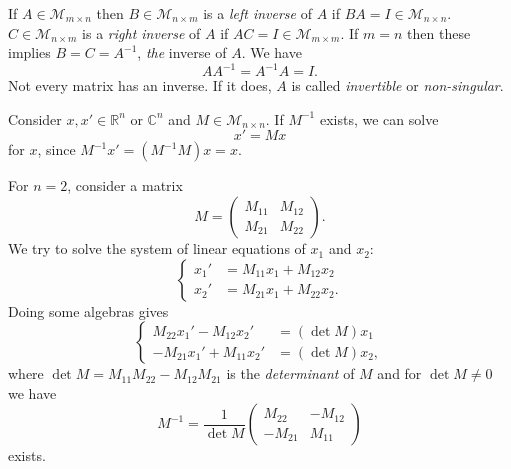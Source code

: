\documentclass[a4paper]{article}
\begin{document}
\begin{definition}
  If $ A\in \mathcal{M}_{m\times n} $ then $ B\in
  \mathcal{M}_{n\times m} $ is a \textit{left inverse} of $A$ if $
  BA=I\in \mathcal{M}_{n \times n} $. $ C\in \mathcal{M}_{n \times m}
  $ is a \textit{right inverse} of $A$ if $ AC=I\in \mathcal{M}_{m
  \times m} $. If $m=n$ then these implies $ B=C=A^{-1} $,
  \textit{the }inverse of $A$. We have
  \[
    AA^{-1}=A^{-1}A=I
  .\]
  Not every matrix has an inverse. If it does, $A$ is called
  \textit{invertible} or \textit{non-singular}.
\end{definition}
Consider $ x,x'\in \mathbb{R}^{n} $ or $\mathbb{C}^{n}$ and $ M\in
\mathcal{M}_{n \times n} $. If $ M^{-1} $ exists, we can solve
\[
  x'=Mx
\]
for $x$, since $ M^{-1}x'=(M^{-1}M)x=x $.
\begin{example}
  For $n=2$, consider a matrix
  \[
    M=
    \begin{pmatrix}
      M_{11}&M_{12}\\
      M_{21}&M_{22}
    \end{pmatrix}
  .\]
  We try to solve the system of linear equations of $x_1$ and $x_2$:
  \[
    \left\{
      \begin{aligned}
        x_{1}'&=M_{11}x_1+M_{12}x_2\\
        x_2'&=M_{21}x_1+M_{22}x_2.
      \end{aligned}\right.
    \]
    Doing some algebras gives
    \[
      \left\{
        \begin{aligned}
          M_{22}x_1'-M_{12}x_2'&=(\det M)x_1\\
          -M_{21}x_1'+M_{11}x_2'&=(\det M)x_2,
        \end{aligned}\right.
      \]
      where $ \det M=M_{11}M_{22}-M_{12}M_{21} $ is the
      \textit{determinant} of $M$ and for $ \det M\neq 0 $ we have
      \[
        M^{-1}=\frac{1}{\det M}
        \begin{pmatrix}
          M_{22}&-M_{12}\\
          -M_{21}&M_{11}
        \end{pmatrix}
      \]
      exists.
    \end{example}
\end{document}
